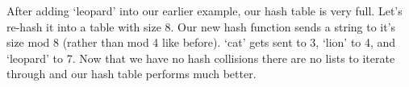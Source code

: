 After adding `leopard' into our earlier example, our hash table is very full. Let's re-hash it into a table with size 8.
Our new hash function sends a string to it's size mod 8 (rather than mod 4 like before).
`cat' gets sent to 3, `lion' to 4, and `leopard' to 7.
Now that we have no hash collisions there are no lists to iterate through and our hash table performs much better.
\begin{center}
\end{center}

